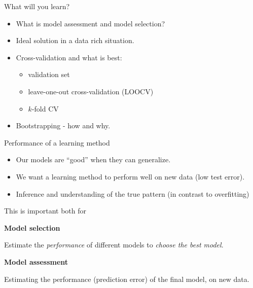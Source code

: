 \documentclass[
  10pt,
  ignorenonframetext,
]{beamer}
\providecommand{\tightlist}{%
  \setlength{\itemsep}{0pt}\setlength{\parskip}{0pt}}
\begin{document}
\begin{frame}
\begin{block}{What will you learn?}
\protect\hypertarget{what-will-you-learn}{}
\(~\)

\begin{itemize}
\tightlist
\item
  What is model assessment and model selection?
\end{itemize}

\vspace{2mm}

\begin{itemize}
\tightlist
\item
  Ideal solution in a data rich situation.
\end{itemize}

\vspace{2mm}

\begin{itemize}
\tightlist
\item
  Cross-validation and what is best:

  \begin{itemize}
  \tightlist
  \item
    validation set
  \item
    leave-one-out cross-validation (LOOCV)
  \item
    \(k\)-fold CV
  \end{itemize}
\end{itemize}

\vspace{2mm}

\begin{itemize}
\tightlist
\item
  Bootstrapping - how and why.
\end{itemize}
\end{block}
\end{frame}

\begin{frame}{Performance of a learning method}
\protect\hypertarget{performance-of-a-learning-method}{}
\begin{itemize}
\item
  Our models are ``good'' when they can generalize.
\item
  We want a learning method to perform well on new data (low test
  error).
\item
  Inference and understanding of the true pattern (in contrast to
  overfitting)
\end{itemize}

\vspace{2mm}

This is important both for

\textbf{Model selection}

Estimate the \emph{performance} of different models to \emph{choose the
best model}.

\textbf{Model assessment}

Estimating the performance (prediction error) of the final model, on new
data.
\end{frame}
\end{document}
